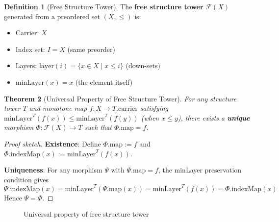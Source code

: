 \documentclass[11pt,a4paper]{article}
\theoremstyle{plain}
\newtheorem{theorem}{Theorem}[section]
\theoremstyle{definition}
\newtheorem{definition}[theorem]{Definition}
\newcommand{\minmark}{\mathrm{minLayer}}
\newcommand{\layer}{\mathrm{layer}}
\begin{document}
\begin{definition}[Free Structure Tower]
\label{def:free-tower}
The \textbf{free structure tower} $\mathcal{F}(X)$ generated from a 
preordered set $(X, \leq)$ is:
\begin{itemize}
  \item Carrier: $X$
  \item Index set: $I = X$ (same preorder)
  \item Layers: $\layer(i) = \{x \in X \mid x \leq i\}$ (down-sets)
  \item $\minmark(x) = x$ (the element itself)
\end{itemize}
\end{definition}

\begin{theorem}[Universal Property of Free Structure Tower]
\label{thm:free-tower-universal}
For any structure tower $T$ and monotone map $f : X \to T.\mathrm{carrier}$ 
satisfying $\minmark^T(f(x)) \leq \minmark^T(f(y))$ (when $x \leq y$),
there exists a \textbf{unique} morphism 
$\Phi : \mathcal{F}(X) \to T$ such that $\Phi.\mathrm{map} = f$.
\end{theorem}

\begin{proof}[Proof sketch]
\textbf{Existence}: Define $\Phi.\mathrm{map} := f$ and 
$\Phi.\mathrm{indexMap}(x) := \minmark^T(f(x))$.

\textbf{Uniqueness}: For any morphism $\Psi$ with $\Psi.\mathrm{map} = f$,
the minLayer preservation condition gives
\[
  \Psi.\mathrm{indexMap}(x) = \minmark^T(\Psi.\mathrm{map}(x)) 
  = \minmark^T(f(x)) = \Phi.\mathrm{indexMap}(x)
\]
Hence $\Psi = \Phi$.
\end{proof}

\begin{figure}[htbp]
\centering
{}
\caption{Universal property of free structure tower}
\label{fig:universal}
\end{figure}

\end{document}
